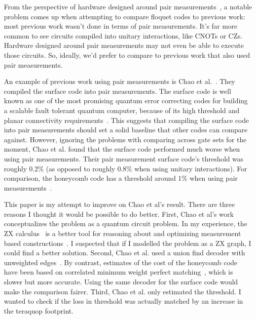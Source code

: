 \documentclass[onecolumn,unpublished,a4paper]{quantumarticle}
\theoremstyle{definition}
\theoremstyle{definition}
\theoremstyle{definition}
\begin{document}
From the perspective of hardware designed around pair measurements~\cite{paetznick2022floquetmajoranaperformance}, a notable problem comes up when attempting to compare floquet codes to previous work: most previous work wasn't done in terms of pair measurements.
It's far more common to see circuits compiled into unitary interactions, like CNOTs or CZs.
Hardware designed around pair measurements may not even be able to execute those circuits.
So, ideally, we'd prefer to compare to previous work that also used pair measurements.

An example of previous work using pair measurements is Chao et al.~\cite{chao2020optimization}.
They compiled the surface code into pair measurements.
The surface code is well known as one of the most promising quantum error correcting codes for building a scalable fault tolerant quantum computer, because of its high threshold and planar connectivity requirements~\cite{fowler2012surfacecodereview}.
This suggests that compiling the surface code into pair measurements should set a solid baseline that other codes can compare against.
However, ignoring the problems with comparing across gate sets for the moment, Chao et al. found that the surface code performed much worse when using pair measurements.
Their pair measurement surface code's threshold was roughly $0.2\%$ (as opposed to roughly $0.8\%$ when using unitary interactions).
For comparison, the honeycomb code has a threshold around $1\%$ when using pair measurements~\cite{gidney2022planarhoneycomb,paetznick2022floquetmajoranaperformance}.

This paper is my attempt to improve on Chao et al's result.
There are three reasons I thought it would be possible to do better.
First, Chao et al's work conceptualizes the problem as a quantum circuit problem.
In my experience, the ZX calculus~\cite{coecke2011introducezx} is a better tool for reasoning about and optimizing measurement based constructions~\cite{de2017zxlattice}.
I suspected that if I modelled the problem as a ZX graph, I could find a better solution.
Second, Chao et al. used a union find decoder with unweighted edges~\cite{delfosse2021almost}.
By contrast, estimates of the cost of the honeycomb code have been based on correlated minimum weight perfect matching~\cite{gidney2021honeycombmemory,gidney2022planarhoneycomb}, which is slower but more accurate.
Using the same decoder for the surface code would make the comparison fairer.
Third, Chao et al. only estimated the threshold.
I wanted to check if the loss in threshold was actually matched by an increase in the teraquop footprint.
\end{document}
